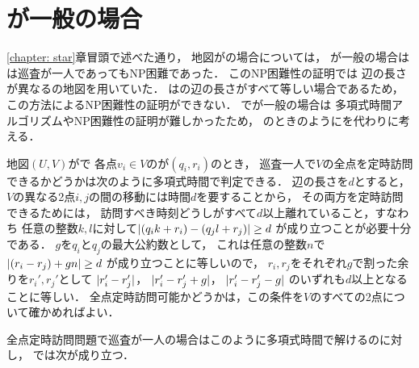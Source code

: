 \section{{\maxIdletime}が一般の場合}
\label{section: UnitArbitraryIdletime}

\ref{chapter: star}章冒頭で述べた通り，
地図が{\graphStar}の場合については，
{\maxIdletime}が一般の場合は
{\PPProfit}は巡査が一人であってもNP困難であった\cite[Theorem~6]{coene2011charlemagne}．
このNP困難性の証明では
辺の長さが異なる{\graphStar}の地図を用いていた．
{\graphUnit}は{\graphStar}の辺の長さがすべて等しい場合であるため，
この方法によるNP困難性の証明ができない．
{\graphUnit}で{\maxIdletime}が一般の場合は
多項式時間アルゴリズムやNP困難性の証明が難しかったため，
{\graphLine}のときのように{\timeSpecifiedPPProfit}を代わりに考える．


地図$(U, V)$が{\graphUnit}で
各点$v_i \in V$の{\exactTime}が$(q_i, r_i)$のとき，
巡査一人で$V$の全点を定時訪問できるかどうかは次のように多項式時間で判定できる．
%
辺の長さを$d$とすると，
$V$の異なる2点$i, j$の間の移動には時間$d$を要することから，
その両方を定時訪問できるためには，
訪問すべき時刻どうしがすべて$d$以上離れていること，すなわち
任意の整数$k, l$に対して$\lvert{(q_i k + r_i) - (q_j l + r_j)}\rvert \geq d$%
が成り立つことが必要十分である．
$g$を$q_i$と$q_j$の最大公約数として，
これは任意の整数$n$で
$\lvert{(r_i - r_j) + gn}\rvert \geq d$%
が成り立つことに等しいので，
$r_i, r_j$をそれぞれ$g$で割った余りを$r_i', r_j'$として
$\lvert{r_i' - r_j'}\rvert$，
$\lvert{r_i' - r_j' + g}\rvert$，
$\lvert{r_i' - r_j' - g}\rvert$%
のいずれも$d$以上となることに等しい．
%
全点定時訪問可能かどうかは，この条件を$V$のすべての2点について確かめればよい．

全点定時訪問問題で巡査が一人の場合はこのように多項式時間で解けるのに対し，
{\timeSpecifiedPPProfit}では次が成り立つ．


